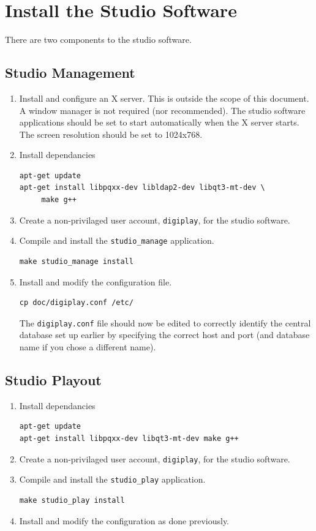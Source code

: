 \documentclass[a4paper,12pt]{report}
\numberwithin{equation}{section}
\begin{document}
\section{Install the Studio Software}
There are two components to the studio software. 
\subsection{Studio Management}
\begin{enumerate}
\item Install and configure an X server. This is outside the scope of this document. A window manager is not required (nor recommended). The studio software applications should be set to start automatically when the X server starts. The screen resolution should be set to 1024x768.
\item Install dependancies
\begin{lstlisting}
apt-get update
apt-get install libpqxx-dev	libldap2-dev libqt3-mt-dev \
     make g++
\end{lstlisting}
\item Create a non-privilaged user account, \texttt{digiplay}, for the studio software.
\item Compile and install the \texttt{studio\_manage} application.
\begin{lstlisting}
make studio_manage install
\end{lstlisting}
\item Install and modify the configuration file.
\begin{lstlisting}
cp doc/digiplay.conf /etc/
\end{lstlisting}
The \texttt{digiplay.conf} file should now be edited to correctly identify the central database set up earlier by specifying the correct host and port (and database name if you chose a different name).
\end{enumerate}
\subsection{Studio Playout}
\begin{enumerate}
\item Install dependancies
\begin{lstlisting}
apt-get update
apt-get install libpqxx-dev libqt3-mt-dev make g++
\end{lstlisting}
\item Create a non-privilaged user account, \texttt{digiplay}, for the studio software.
\item Compile and install the \texttt{studio\_play} application.
\begin{lstlisting}
make studio_play install
\end{lstlisting}
\item Install and modify the configuration as done previously.
\end{enumerate}
\end{document}
